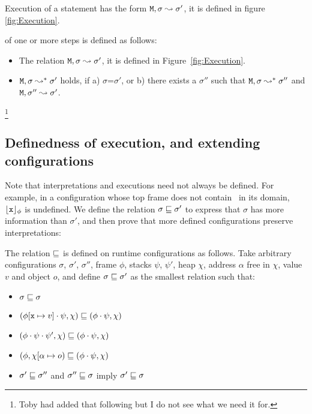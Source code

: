 Execution of a statement has the form ${\mbox{\tt{\ensuremath{{\mbox{\tt{M}}}}}}}, \sigma \leadsto \sigma'$, it is defined in figure \ref{fig:Execution}.

\begin{definition}[Execution] of one or more steps is defined as follows:

\begin{itemize}
     \item
   The relation ${\mbox{\tt{\ensuremath{{\mbox{\tt{M}}}}}}}, \sigma \leadsto \sigma'$, it is defined in Figure~\ref{fig:Execution}.

   \item
   ${\mbox{\tt{\ensuremath{{\mbox{\tt{M}}}}}}}, \sigma \leadsto^* \sigma'$ holds, if a) $\sigma$=$\sigma'$, or b) there exists a $\sigma''$ such that
   ${\mbox{\tt{\ensuremath{{\mbox{\tt{M}}}}}}}, \sigma \leadsto^* \sigma''$ and ${\mbox{\tt{\ensuremath{{\mbox{\tt{M}}}}}}}, \sigma'' \leadsto \sigma'$.
 \end{itemize}

\end{definition}

\footnote{Toby had added that following but I do not see what we need it for. }

\subsection{Definedness of execution, and extending configurations}

Note that interpretations and executions need not always be defined.
For example, in a configuration whose top frame does not contain \x\,  in its domain, ${\lfloor{ {{\mbox{\tt{x}}}}}\rfloor_{\phi}} $ is undefined. We define the relation $\sigma \sqsubseteq \sigma'$ to express that   $\sigma$ has more information than $\sigma'$, and then prove that more defined configurations preserve interpretations:

\begin{definition}
The relation $\sqsubseteq$   is defined on runtime configurations as follows. Take arbitrary
configurations $\sigma$, $\sigma'$, $\sigma''$, frame $\phi$, stacks $\psi$, $\psi'$,  heap $\chi$, address $\alpha$ free in $\chi$, value $v$ and object $o$, and define $\sigma  \sqsubseteq \sigma'$ as the smallest relation such that:

\begin{itemize}
\item
$\sigma  \sqsubseteq \sigma$
\item
$(\phi[{\mbox{\tt{x}}} \mapsto v]\cdot \psi, \chi) \sqsubseteq  (\phi\cdot \psi, \chi)$
\item
$(\phi\cdot\psi\cdot\psi', \chi) \sqsubseteq  (\phi\cdot \psi, \chi)$
\item
$(\phi, \chi[\alpha \mapsto o) \sqsubseteq  (\phi\cdot \psi, \chi)$
\item
$\sigma'  \sqsubseteq \sigma''$ and $\sigma''  \sqsubseteq \sigma$ imply $\sigma'  \sqsubseteq \sigma$
\end{itemize}
\end{definition}



